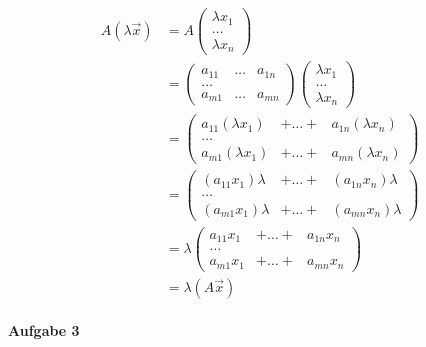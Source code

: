\documentclass[a4paper,12pt]{article}
\begin{document}
\begin{align*}
    A(\lambda\vec x) & = A\begin{pmatrix}\lambda x_1\\\dots\\\lambda x_n\end{pmatrix}                                                                           \\
                     & = \begin{pmatrix}a_{11}&\dots&a_{1n}\\\dots\\a_{m1}&\dots&a_{mn}\end{pmatrix}\begin{pmatrix}\lambda x_1\\\dots\\\lambda x_n\end{pmatrix} \\
                     & = \begin{pmatrix}a_{11}(\lambda x_1)&+\dots+&a_{1n}(\lambda x_n)\\\dots\\a_{m1}(\lambda x_1)&+\dots+&a_{mn}(\lambda x_n)\end{pmatrix}    \\
                     & = \begin{pmatrix}(a_{11}x_1)\lambda&+\dots+&(a_{1n}x_n)\lambda\\\dots\\(a_{m1}x_1)\lambda&+\dots+&(a_{mn}x_n)\lambda\end{pmatrix}        \\
                     & = \lambda\begin{pmatrix}a_{11}x_1&+\dots+&a_{1n}x_n\\\dots\\a_{m1}x_1&+\dots+&a_{mn}x_n\end{pmatrix}                                     \\
                     & = \lambda(A\vec x) \tag*{$\Box$}
\end{align*}

\clearpage

\paragraph{Aufgabe 3}
\end{document}
